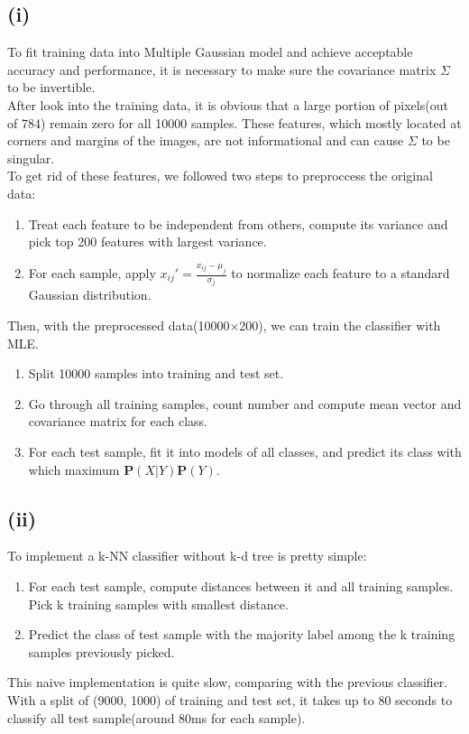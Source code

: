 \documentclass[twoside,11pt]{homework}
\begin{document}
\subsection*{(i)}
To fit training data into Multiple Gaussian model and achieve acceptable accuracy and performance, it is necessary to make sure the covariance matrix $\Sigma$ to be invertible. \\
After look into the training data, it is obvious that a large portion of pixels(out of 784) remain zero for all 10000 samples. These features, which mostly located at corners and margins of the images, are not informational and can cause $\Sigma$ to be singular. \\
To get rid of these features, we followed two steps to preproccess the original data: \\
\begin{enumerate}
\item Treat each feature to be independent from others, compute its variance and pick top 200 features with largest variance.
\item For each sample, apply $x_{ij}' = \frac{x_{ij} - \mu_j}{\sigma_j}$ to normalize each feature to a standard Gaussian distribution.
\end{enumerate}
Then, with the preprocessed data(10000$\times$200), we can train the classifier with MLE.
\begin{enumerate}
\item Split 10000 samples into training and test set.
\item Go through all training samples, count number and compute mean vector and covariance matrix for each class.
\item For each test sample, fit it into models of all classes, and predict its class with which maximum $\mathbf{P}(X|Y)\mathbf{P}(Y)$.
\end{enumerate}
\subsection*{(ii)}
To implement a k-NN classifier without k-d tree is pretty simple:
\begin{enumerate}
\item For each test sample, compute distances between it and all training samples. Pick k training samples with smallest distance.
\item Predict the class of test sample with the majority label among the k training samples previously picked.
\end{enumerate}
This naive implementation is quite slow, comparing with the previous classifier. With a split of (9000, 1000) of training and test set, it takes up to 80 seconds to classify all test sample(around 80ms for each sample).
\end{document}
